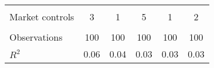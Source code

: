 \begin{tabular}{lccccc}
\smallskip\\
Market controls &                            3 &                       1 &                            5 &                            1 &                            2 \\
\smallskip\\
Observations    &                          100 &                     100 &                          100 &                          100 &                          100 \\
$R^2$           &                         0.06 &                    0.04 &                         0.03 &                         0.03 &                         0.03 \\
\hline
\end{tabular}
